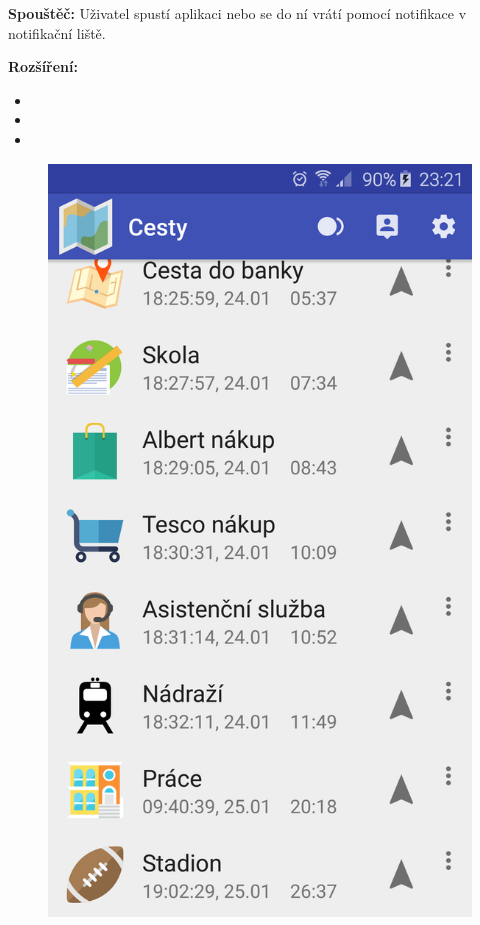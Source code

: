 \documentclass{article}
\begin{document}
\vspace{0.1cm}
\noindent
\textbf{Spouštěč:} Uživatel spustí aplikaci nebo se do ní vrátí pomocí notifikace v notifikační liště.

\vspace{0.1cm}
\noindent
\textbf{Rozšíření:}
\begin{itemize}
  \item {}
  \item {}
  \item {}
\end{itemize}

\begin{figure}[H]
\begin{minipage}{.5\textwidth}
\centering
                \includegraphics[scale=0.14]{img/screen/seznamcest.png}

\end{minipage}
\end{figure}
\end{document}
